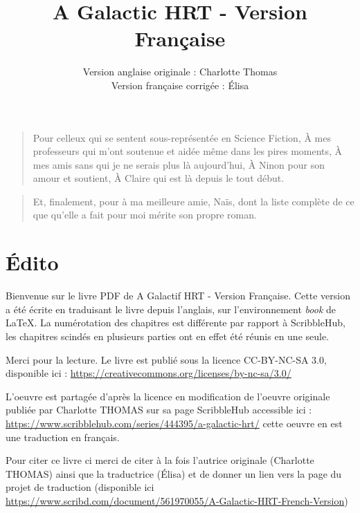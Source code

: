 \documentclass[12pt,colorlinks,a4paper]{book}
\title{A Galactic HRT - Version Française}
\author{Version anglaise originale : Charlotte Thomas \\ Version française corrigée : Élisa}
\renewcommand{\cdot}{\textperiodcentered}
\newenvironment{dedication}
  {\vspace{6ex}\begin{quotation}\begin{em}}
  {\par\end{em}\end{quotation}}
\begin{document}
\maketitle 
\begin{dedication}
  Pour celleux qui se sentent sous-représenté\cdot e en Science Fiction,\newline
  À mes professeurs qui m'ont soutenue et aidée même dans les pires moments,\newline
  À mes amis sans qui je ne serais plus là aujourd'hui,\newline
  À Ninon pour son amour et soutient,\newline
  À Claire qui est là depuis le tout début.
\end{dedication}

\begin{dedication}
  \begin{center}
  Et, finalement, pour à ma meilleure amie, Naïs, dont la liste complète de ce que qu'elle a fait pour moi mérite son propre roman.
  \end{center}
\end{dedication}

\tableofcontents

\chapter*{Édito}

Bienvenue sur le livre PDF de A Galactif HRT - Version Française. Cette version a été
écrite en traduisant le livre depuis l'anglais, sur l'environnement
\textit{book} de \LaTeX .
\bigskip
La numérotation des chapitres est différente par rapport à ScribbleHub,
les chapitres scindés en plusieurs parties ont en effet été réunis
en une seule.

\bigskip
Merci pour la lecture. Le livre est publié sous la licence CC-BY-NC-SA
3.0, disponible ici : \url{https://creativecommons.org/licenses/by-nc-sa/3.0/}

L'oeuvre est partagée d'après la licence en modification de l'oeuvre originale publiée par 
Charlotte THOMAS sur sa page ScribbleHub accessible ici : \url{https://www.scribblehub.com/series/444395/a-galactic-hrt/} cette 
oeuvre en est une traduction en français. \par
\bigskip

Pour citer ce livre ci merci de citer à la fois l'autrice originale (Charlotte THOMAS) ainsi que 
la traductrice (Élisa) et de donner un lien vers la page du projet de traduction (disponible ici \url{https://www.scribd.com/document/561970055/A-Galactic-HRT-French-Version})
\end{document}
